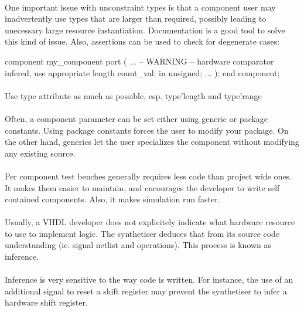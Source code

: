 \documentclass[12pt]{article}
\begin{document}
\paragraph{}
One important issue with unconstraint types is that a component
user may inadvertently use types that are larger than required,
possibly leading to unecessary large resource instantiation.
Documentation is a good tool to solve this kind of issue. Also,
assertions can be used to check for degenerate cases:
\begin{vhdl}
component my_component
port
(
 ...
 -- WARNING
 -- hardware comparator infered, use appropriate length
 count_val: in unsigned;
 ...
);
end component;
\end{vhdl}


\paragraph{}
Use type attribute as much as possible, esp. type'length
and type'range


\paragraph{}
Often, a component parameter can be set either using
generic or package constants. Using package constants
forces the user to modify your package. On the other
hand, generics let the user specializes the component
without modifying any existing source.


\paragraph{}
Per component test benches generally requires less code than
project wide ones. It makes them easier to maintain, and
encourages the developer to write self contained components.
Also, it makes simulation run faster.


\paragraph{}
Usually, a VHDL developer does not explicitely indicate what
hardware resource to use to implement logic. The synthetiser
deduces that from its source code understanding (ie. signal
netlist and operations). This process is known as inference.
\paragraph{}
Inference is very sensitive to the way code is written. For
instance, the use of an additional signal to reset a shift
register may prevent the synthetiser to infer a hardware
shift register.
\end{document}
